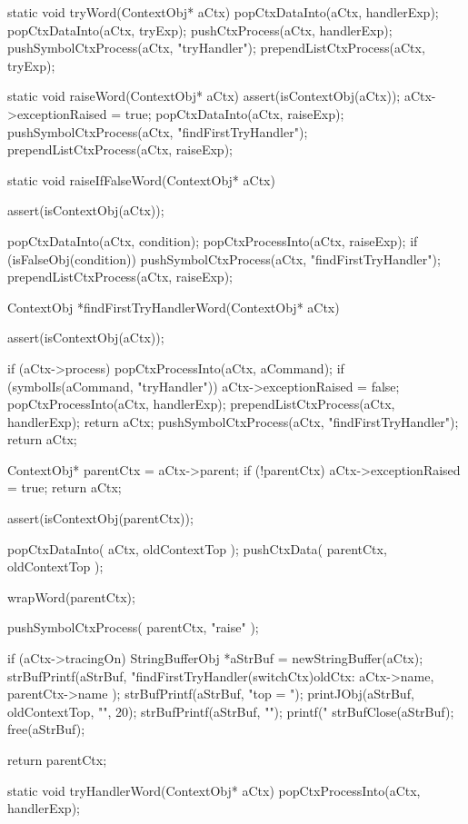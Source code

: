 \startCCode
static void tryWord(ContextObj* aCtx) {
  popCtxDataInto(aCtx, handlerExp);
  popCtxDataInto(aCtx, tryExp);
  pushCtxProcess(aCtx, handlerExp);
  pushSymbolCtxProcess(aCtx, "tryHandler");
  prependListCtxProcess(aCtx, tryExp);
}
\stopCCode

\startCCode
static void raiseWord(ContextObj* aCtx) {
  assert(isContextObj(aCtx));
  aCtx->exceptionRaised = true;
  popCtxDataInto(aCtx, raiseExp);
  pushSymbolCtxProcess(aCtx, "findFirstTryHandler");
  prependListCtxProcess(aCtx, raiseExp);
}
\stopCCode

\startCCode
static void raiseIfFalseWord(ContextObj* aCtx) {
  assert(isContextObj(aCtx));

  popCtxDataInto(aCtx, condition);
  popCtxProcessInto(aCtx, raiseExp);
  if (isFalseObj(condition)) {
    pushSymbolCtxProcess(aCtx, "findFirstTryHandler");
    prependListCtxProcess(aCtx, raiseExp);
  }
}
\stopCCode

\startCCode
ContextObj *findFirstTryHandlerWord(ContextObj* aCtx) {
  assert(isContextObj(aCtx));

  if (aCtx->process) {
    popCtxProcessInto(aCtx, aCommand);
    if (symbolIs(aCommand, "tryHandler")) {
      aCtx->exceptionRaised = false;
      popCtxProcessInto(aCtx, handlerExp);
      prependListCtxProcess(aCtx, handlerExp);
      return aCtx;
    }
    pushSymbolCtxProcess(aCtx, "findFirstTryHandler");
    return aCtx;
  }

  ContextObj* parentCtx = aCtx->parent;
  if (!parentCtx) {
    aCtx->exceptionRaised = true;
    return aCtx;
  }

  assert(isContextObj(parentCtx));
  
  popCtxDataInto(   aCtx,      oldContextTop );
  pushCtxData(      parentCtx, oldContextTop );
  
  wrapWord(parentCtx);
  
  pushSymbolCtxProcess( parentCtx, "raise"       );

  if (aCtx->tracingOn) {
    StringBufferObj *aStrBuf = newStringBuffer(aCtx);
    strBufPrintf(aStrBuf,
      "findFirstTryHandler(switchCtx)\n oldCtx: %
      aCtx->name, parentCtx->name
    );
    strBufPrintf(aStrBuf, "top = ");
    printJObj(aStrBuf, oldContextTop, "", 20);
    strBufPrintf(aStrBuf, "\n");
    printf("%
    strBufClose(aStrBuf);
    free(aStrBuf);
  }

  return parentCtx;
}
\stopCCode

\startCCode
static void tryHandlerWord(ContextObj* aCtx) {
  popCtxProcessInto(aCtx, handlerExp);
}
\stopCCode

